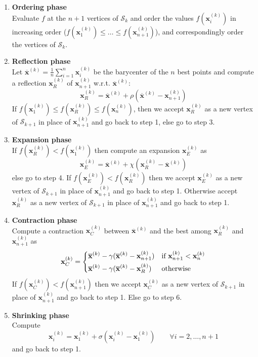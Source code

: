 \begin{enumerate}
    \item \textbf{Ordering phase}\\
    Evaluate $f$ at the $n+1$ vertices of $\mathcal{S}_k$ and order the values $f(\mathbf{x}_i^{(k)})$ in increasing order ($f(\mathbf{x}_1^{(k)}) \leq \dots \leq f(\mathbf{x}_{n+1}^{(k)})$), and correspondingly order the vertices of $\mathcal{S}_k$.
    \item \textbf{Reflection phase}\\
    Let $\mathbf{\overline{x}}^{(k)} = \frac{1}{n}\sum_{i=1}^n \mathbf{x}_i^{(k)}$ be the barycenter of the $n$ best points and compute a reflection $\mathbf{x}_R^{(k)}$ of $\mathbf{x}_{n+1}^{(k)}$ w.r.t. $\overline{\mathbf{x}}^{(k)}$:
    \[
    \mathbf{x}_R^{(k)} = \overline{\mathbf{x}}^{(k)} + \rho (\overline{\mathbf{x}}^{(k)} - \mathbf{x}_{n+1}^{(k)})
    \]
    If $f(\mathbf{x}_1^{(k)}) \leq f(\mathbf{x}_R^{(k)}) \leq f(\mathbf{x}_n^{(k)})$, then we accept $\mathbf{x}_R^{(k)}$ as a new vertex of $\mathcal{S}_{k+1}$ in place of $\mathbf{x}_{n+1}^{(k)}$ and go back to step 1, else go to step 3.
    \item \textbf{Expansion phase}\\
    If $f(\mathbf{x}_R^{(k)}) < f(\mathbf{x}_1^{(k)})$ then compute an expansion $\mathbf{x}_E^{(k)}$ as
    \[
    \mathbf{x}_E^{(k)} = \overline{\mathbf{x}}^{(k)} + \chi (\mathbf{x}_R^{(k)} - \overline{\mathbf{x}}^{(k)})
    \]
    else go to step 4.
    If $f(\mathbf{x}_E^{(k)}) < f(\mathbf{x}_R^{(k)})$ then we accept $\mathbf{x}_E^{(k)}$ as a new vertex of $\mathcal{S}_{k+1}$ in place of $\mathbf{x}_{n+1}^{(k)}$ and go back to step 1. Otherwise accept $\mathbf{x}_R^{(k)}$ as a new vertex of $\mathcal{S}_{k+1}$ in place of $\mathbf{x}_{n+1}^{(k)}$ and go back to step 1.
    \item \textbf{Contraction phase}\\
    Compute a contraction $\mathbf{x}_C^{(k)}$ between $\overline{\mathbf{x}}^{(k)}$ and the best among $\mathbf{x}_R^{(k)}$ and $\mathbf{x}_{n+1}^{(k)}$ as
    \[
    \mathbf{x}_C^{(k)} =
    \begin{dcases}
        \overline{\mathbf{x}}^{(k)} - \gamma (\overline{\mathbf{x}}^{(k)} - \mathbf{x}_{n+1}^{(k)}) & \text{if } \mathbf{x}_{n+1}^{(k)} < \mathbf{x}_n^{(k)}\\
        \overline{\mathbf{x}}^{(k)} - \gamma (\overline{\mathbf{x}}^{(k)} - \mathbf{x}_R^{(k)}) & \text{otherwise}\\
    \end{dcases}
    \]
    If $f(\mathbf{x}_C^{(k)}) < f(\mathbf{x}_{n+1}^{(k)})$ then we accept $\mathbf{x}_C^{(k)}$ as a new vertex of $\mathcal{S}_{k+1}$ in place of $\mathbf{x}_{n+1}^{(k)}$ and go back to step 1. Else go to step 6.
    \item \textbf{Shrinking phase}\\
    Compute
    \[
    \mathbf{x}_i^{(k)} = \mathbf{x}_1^{(k)} + \sigma (\mathbf{x}_i^{(k)} - \mathbf{x}_1^{(k)}) \qquad \forall i=2,\dots,n+1
    \]
    and go back to step 1.
\end{enumerate}

